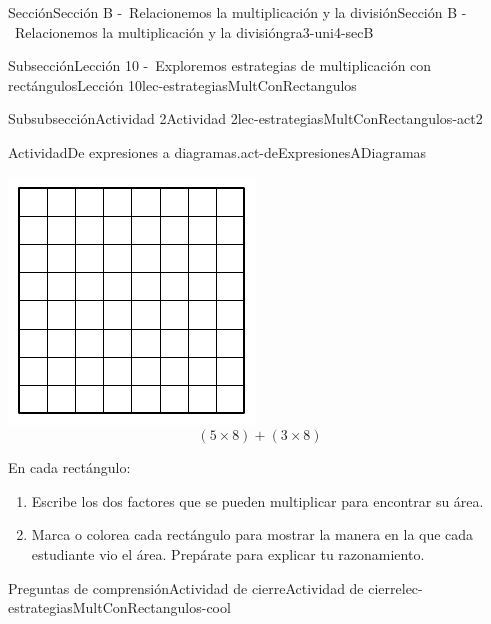 \documentclass[twoside,10pt,]{article}
\begin{document}
\begin{sectionptx}{Sección}{Sección B -~Relacionemos la multiplicación y la división}{}{Sección B -~Relacionemos la multiplicación y la división}{}{}{gra3-uni4-secB}
\begin{subsectionptx}{Subsección}{Lección 10 -~Exploremos estrategias de multiplicación con rectángulos}{}{Lección 10}{}{}{lec-estrategiasMultConRectangulos}
\begin{subsubsectionptx}{Subsubsección}{Actividad 2}{}{Actividad 2}{}{}{lec-estrategiasMultConRectangulos-act2}
\begin{activity}{Actividad}{De expresiones a diagramas.}{act-deExpresionesADiagramas}
\begin{sidebyside}{3}{0.0166666666666667}{0.0166666666666667}{0.0333333333333333}
\begin{sbspanel}{0.3}
\includegraphics[width=\linewidth]{external/svg-source/tikz-file-153054.pdf}
%
\begin{equation*}
(5 \times 8) + (3 \times 8)
\end{equation*}
%
\end{sbspanel}%
\end{sidebyside}%
\par
En cada rectángulo:%
%
\begin{enumerate}
\item{}Escribe los dos factores que se pueden multiplicar para encontrar su área.%
\item{}Marca o colorea cada rectángulo para mostrar la manera en la que cada estudiante vio el área. Prepárate para explicar tu razonamiento.%
\end{enumerate}
\end{activity}%
\end{subsubsectionptx}
%
%
\typeout{************************************************}
\typeout{************************************************}
%
\begin{reading-questions-subsubsection}{Preguntas de comprensión}{Actividad de cierre}{}{Actividad de cierre}{}{}{lec-estrategiasMultConRectangulos-cool}

\end{reading-questions-subsubsection}
\end{subsectionptx}
\end{sectionptx}
\end{document}
